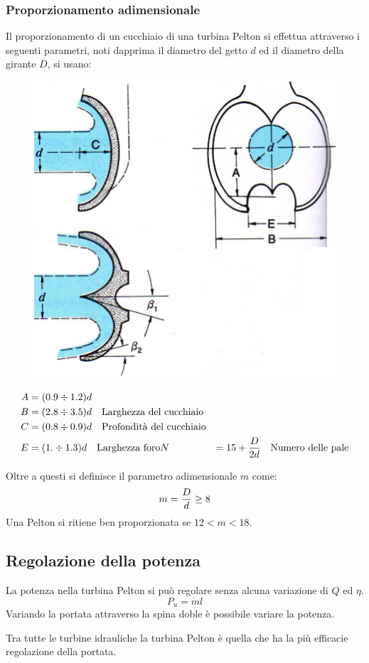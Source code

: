 \documentclass[a4paper, 15pt]{article}
\begin{document}
\newpage

\subsubsection{Proporzionamento adimensionale}
\begin{adjustwidth}{2in}{}
	Il proporzionamento di un cucchiaio di una turbina Pelton si effettua attraverso i seguenti parametri, noti dapprima il diametro del getto $d$ ed il diametro della girante $D$, si usano:
	\begin{figure}[H]
		\centering
		\includegraphics[width=0.5\linewidth]{immagini/turbinapelton7.1}
		\label{fig:turbinapelton7.1}
	\end{figure}	
	\[
		\begin{aligned}
			A &= (0.9\div1.2)d \\
		B &= (2.8\div3.5)d\quad\text{Larghezza del cucchiaio} \\
		C &= (0.8\div0.9)d\quad\text{Profondità del cucchiaio} \\
		E &= (1.\div1.3)d\quad\text{Larghezza foro}
		N &= 15 + {D\over 2d}\quad\text{Numero delle pale}
		\end{aligned}
		\]

	Oltre a questi si definisce il parametro adimensionale $m$ come:
	\[m = {D\over d}\geq8\]
	Una Pelton si ritiene ben proporzionata se $12<m<18$.
\end{adjustwidth}



\subsection{Regolazione della potenza}
\begin{adjustwidth}{2in}{}
	La potenza nella turbina Pelton si può regolare senza alcuna variazione di $Q$ ed $\eta$.
	\[P_u = \dot{m}l\]
	Variando la portata attraverso la spina doble è possibile variare la potenza. 
	
	Tra tutte le turbine idrauliche la turbina Pelton è quella che ha la più efficacie regolazione della portata.
\end{adjustwidth}
\end{document}
